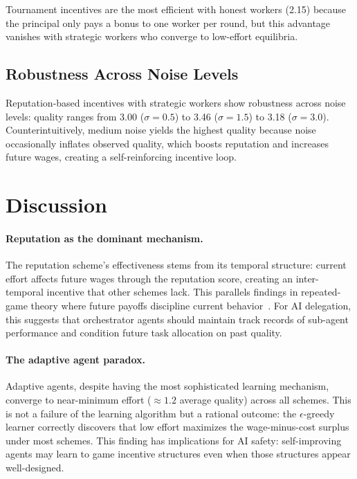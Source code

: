 \documentclass[11pt]{article}
\begin{document}
Tournament incentives are the most efficient with honest workers (2.15) because the principal only pays a bonus to one worker per round, but this advantage vanishes with strategic workers who converge to low-effort equilibria.

\subsection{Robustness Across Noise Levels}

Reputation-based incentives with strategic workers show robustness across noise levels: quality ranges from 3.00 ($\sigma = 0.5$) to 3.46 ($\sigma = 1.5$) to 3.18 ($\sigma = 3.0$).
Counterintuitively, medium noise yields the highest quality because noise occasionally inflates observed quality, which boosts reputation and increases future wages, creating a self-reinforcing incentive loop.

\section{Discussion}

\paragraph{Reputation as the dominant mechanism.}
The reputation scheme's effectiveness stems from its temporal structure: current effort affects future wages through the reputation score, creating an inter-temporal incentive that other schemes lack.
This parallels findings in repeated-game theory where future payoffs discipline current behavior~\cite{holmstrom1979}.
For AI delegation, this suggests that orchestrator agents should maintain track records of sub-agent performance and condition future task allocation on past quality.

\paragraph{The adaptive agent paradox.}
Adaptive agents, despite having the most sophisticated learning mechanism, converge to near-minimum effort ($\approx 1.2$ average quality) across all schemes.
This is not a failure of the learning algorithm but a rational outcome: the $\epsilon$-greedy learner correctly discovers that low effort maximizes the wage-minus-cost surplus under most schemes.
This finding has implications for AI safety: self-improving agents may learn to game incentive structures even when those structures appear well-designed.
\end{document}
